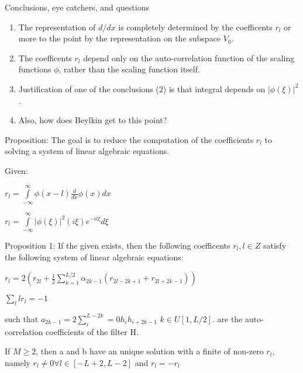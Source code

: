 \documentclass[11pt]{article}
\begin{document}
Conclusions, eye catchers, and questions
\begin{enumerate}
\item The representation of $d/dx$ is completely determined by the coefficents $r_l$ or more to the point by the representation on the subspace $V_0$.
\item The coefficents $r_l$ depend only on the auto-correlation function of the scaling functions $\phi$, rather than the scaling function itself.  
\item Justification of one of the conclusions (2) is that integral depends on $|\phi(\xi)|^2$.  
\item Also, how does Beylkin get to this point?
\end{enumerate}


Proposition: The goal is to reduce the computation of the coefficients $r_l$ to solving a system of linear algebraic equations.

Given:

$r_l = \int\limits^\infty _{-\infty} \phi (x-l) \frac{d}{dx} \phi(x)dx $

$ r_l = \int\limits^\infty_{-\infty} |\phi (\xi)|^2 (i\xi)e^{-il\xi} d\xi   $

 Proposition 1: If the given exists, then the following coefficents $r_l , l \in Z$ satisfy the following system of linear algebraic equations:
 
$r_l = 2( r_{2l} +\frac{1}{2} \sum\limits ^{L/2}_{k=1} \alpha_{2k-1} (r_{2l-2k+1} + r_{2l+2k-1}))$

$\sum\limits_l lr_l =-1$

such that $a_{2k-1} = 2 \sum\limits^{L-2k}_i=0 h_ih_{i+2k-1} $   $k\in U[1,L/2]$.  are the auto-correlation coefficients of the filter H.

If $M \ge 2$, then a and b have an unique solution with a finite of non-zero $r_l$, namely $r_l\not=0 \forall l\in [-L+2,L-2]$ and $r_l = -r_l$







 
\end{document}
